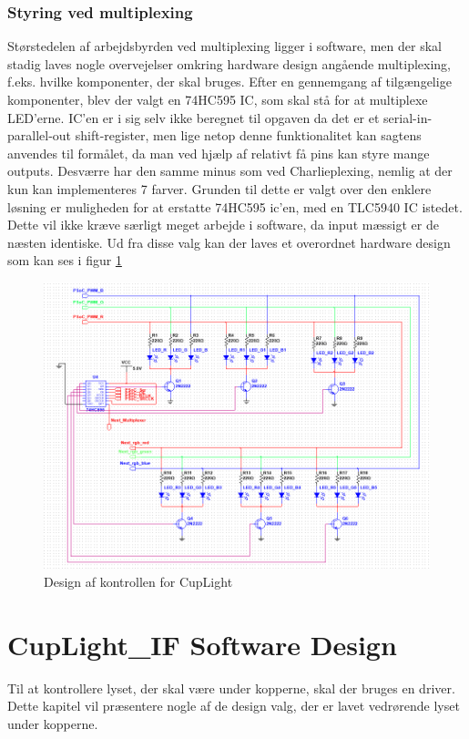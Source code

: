 \documentclass[Softwaredesign/Softwaredesign_main.tex]{subfiles}
\begin{document}
\subsubsection{Styring ved multiplexing}
Størstedelen af arbejdsbyrden ved multiplexing ligger i software, men der skal stadig laves nogle overvejelser omkring hardware design angående multiplexing, f.eks. hvilke komponenter, der skal bruges. Efter en gennemgang af tilgængelige komponenter, blev der valgt en 74HC595 IC, som skal stå for at multiplexe LED'erne. IC'en er i sig selv ikke beregnet til opgaven da det er et serial-in-parallel-out shift-register, men lige netop denne funktionalitet kan sagtens anvendes til formålet, da man ved hjælp af relativt få pins kan styre mange outputs. Desværre har den samme minus som ved Charlieplexing, nemlig at der kun kan implementeres 7 farver. Grunden til dette er valgt over den enklere løsning er muligheden for at erstatte 74HC595 ic'en, med en TLC5940 IC istedet. Dette vil ikke kræve særligt meget arbejde i software, da input mæssigt er de næsten identiske. Ud fra disse valg kan der laves et overordnet hardware design som kan ses i figur \ref{fig:CupLight_HW}
\begin{figure}[H]
    \centering
    \includegraphics[width=\textwidth]{Softwaredesign/CupLight_IF/graphics/CupLight.png}
    \caption{Design af kontrollen for CupLight}
    \label{fig:CupLight_HW}
\end{figure}

\section{CupLight\_IF Software Design}
Til at kontrollere lyset, der skal være under kopperne, skal der bruges en driver. Dette kapitel vil præsentere nogle af de design valg, der er lavet vedrørende lyset under kopperne.
\end{document}
